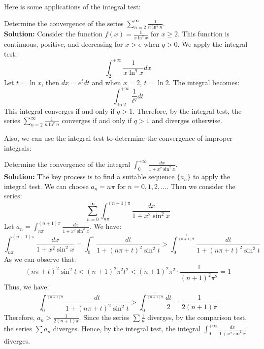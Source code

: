 Here is some applications of the integral test:

\begin{example}
    Determine the convergence of the series $\sum_{n=2}^{\infty} \frac{1}{n \ln^q n}$. \\
    \textbf{Solution:} Consider the function $f(x) = \frac{1}{x \ln^q x}$ for $x \ge 2$. This function is continuous, positive, and decreasing for $x > e$ when $q > 0$. We apply the integral test:
    \[\int_2^{+\infty} \frac{1}{x \ln^q x} dx \]
    Let $t = \ln x$, then $dx = e^t dt$ and when $x = 2$, $t = \ln 2$. The integral becomes:
    \[\int_{\ln 2}^{+\infty} \frac{1}{t^q} dt \]
    This integral converges if and only if $q > 1$. Therefore, by the integral test, the series $\sum_{n=2}^{\infty} \frac{1}{n \ln^q n}$ converges if and only if $q > 1$ and diverges otherwise.
\end{example}

Also, we can use the integral test to determine the convergence of improper integrals:

\newpage

\begin{example}
    Determine the convergence of the integral $\int_{0}^{+\infty} \frac{dx}{1 + x^2 \sin^2 x}$. \\
    \textbf{Solution:} The key process is to find a suitable sequence $\{a_n\}$ to apply the integral test. We can choose $a_n = n\pi$ for $n = 0, 1, 2, \ldots$. Then we consider the series:
    \[\sum_{n=0}^{\infty} \int_{n\pi}^{(n+1)\pi} \frac{dx}{1 + x^2 \sin^2 x}\]
    Let $a_n = \int_{n\pi}^{(n+1)\pi} \frac{dx}{1 + x^2 \sin^2 x}$. We have:
    \[
    \int_{n\pi}^{(n+1)\pi} \frac{dx}{1 + x^2 \sin^2 x} = \int_{0}^{\pi} \frac{dt}{1 + (n\pi + t)^2 \sin^2 t} > \int_{0}^{\frac{1}{(n+1)\pi}} \frac{dt}{1 + (n\pi + t)^2 \sin^2 t}
    \]
    As we can observe that:
    \[
    (n\pi + t)^2 \sin^2 t < (n+1)^2 \pi^2 t^2 < (n+1)^2 \pi^2 \cdot \frac{1}{(n+1)^2 \pi^2} = 1
    \]
    Thus, we have:
    \[\int_{0}^{\frac{1}{(n+1)\pi}} \frac{dt}{1 + (n\pi + t)^2 \sin^2 t} > \int_{0}^{\frac{1}{(n+1)\pi}} \frac{dt}{2} = \frac{1}{2(n+1)\pi}\]
    Therefore, $a_n > \frac{1}{2(n+1)\pi}$. Since the series $\sum \frac{1}{n}$ diverges, by the comparison test, the series $\sum a_n$ diverges. Hence, by the integral test, the integral $\int_{0}^{+\infty} \frac{dx}{1 + x^2 \sin^2 x}$ diverges.
\end{example}

